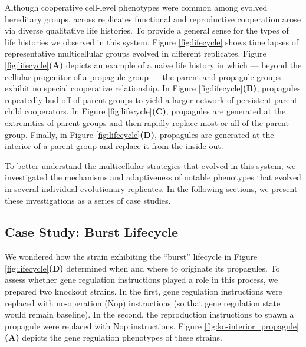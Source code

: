 

Although cooperative cell-level phenotypes were common among evolved hereditary groups, across replicates functional and reproductive cooperation arose via diverse qualitative life histories.
To provide a general sense for the types of life histories we observed in this system, Figure \ref{fig:lifecycle} shows time lapses of representative multicellular groups evolved in different replicates.
Figure \ref{fig:lifecycle}\textbf{(A)} depicts an example of a naive life history in which --- beyond the cellular progenitor of a propagule group --- the parent and propagule groups exhibit no special cooperative relationship.
In Figure \ref{fig:lifecycle}\textbf{(B)}, propagules repeatedly bud off of parent groups to yield a larger network of persistent parent-child cooperators.
In Figure \ref{fig:lifecycle}\textbf{(C)}, propagules are generated at the extremities of parent groups and then rapidly replace most or all of the parent group.
Finally, in Figure \ref{fig:lifecycle}\textbf{(D)}, propagules are generated at the interior of a parent group and replace it from the inside out.

To better understand the multicellular strategies that evolved in this system, we investigated the mechanisms and adaptiveness of notable phenotypes that evolved in several individual evolutionary replicates.
In the following sections, we present these investigations as a series of case studies.



\subsection{Case Study: Burst Lifecycle} \label{sec:gene-regulation}




We wondered how the strain exhibiting the ``burst'' lifecycle in Figure \ref{fig:lifecycle}\textbf{(D)} determined when and where to originate its propagules.
To assess whether gene regulation instructions played a role in this process, we prepared two knockout strains.
In the first, gene regulation instructions were replaced with no-operation (Nop) instructions (so that gene regulation state would remain baseline).
In the second, the reproduction instructions to spawn a propagule were replaced with Nop instructions.
Figure \ref{fig:ko-interior_propagule}\textbf{(A)} depicts the gene regulation phenotypes of these strains.

